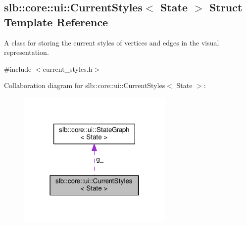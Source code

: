 \hypertarget{structslb_1_1core_1_1ui_1_1CurrentStyles}{}\subsection{slb\+:\+:core\+:\+:ui\+:\+:Current\+Styles$<$ State $>$ Struct Template Reference}
\label{structslb_1_1core_1_1ui_1_1CurrentStyles}


A class for storing the current styles of vertices and edges in the visual representation.  




{\ttfamily \#include $<$current\+\_\+styles.\+h$>$}



Collaboration diagram for slb\+:\+:core\+:\+:ui\+:\+:Current\+Styles$<$ State $>$\+:\nopagebreak
\begin{figure}[H]
\begin{center}
\leavevmode
\includegraphics[width=214pt]{structslb_1_1core_1_1ui_1_1CurrentStyles__coll__graph}
\end{center}
\end{figure}
